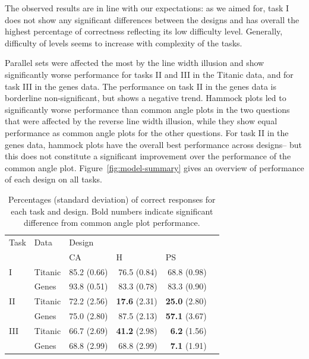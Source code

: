 \documentclass[journal]{vgtc}\usepackage{graphicx, color}
\begin{document}
The observed results are in line with our expectations:
as we aimed for, task I does not show any significant differences between the designs and has overall the highest percentage of correctness reflecting its low difficulty level. Generally, difficulty of levels seems to increase with complexity of the tasks.

Parallel sets were affected the most by the line width illusion and show significantly worse performance for tasks II and III in the Titanic data, and for task III in the genes data. The performance on task II in the genes data is borderline non-significant, but shows a negative trend.
Hammock plots led to significantly worse performance than common angle plots in the two questions that were affected by the reverse line width illusion, while they show equal performance as common angle plots for the other questions. For task II in the genes data,  hammock plots have the overall best performance  across designs-- but this  does not  constitute a significant improvement over the performance of the common angle plot. Figure~\ref{fig:model-summary} gives an overview of  performance of each design on all tasks. 



%
\begin{table}[ht]
\begin{center}
\begin{tabular}{llrrrr}
  \hline
Task & Data & \multicolumn{3}{l}{Design} \\
& & \multicolumn{1}{l}{CA} & \multicolumn{1}{l}{H}  & \multicolumn{1}{l}{PS}  \\ 
  \hline
 I & Titanic & 85.2 (0.66) & 76.5 (0.84) & 68.8 (0.98) \\ 
& Genes & 93.8 (0.51) & 83.3 (0.78) & 83.3 (0.90) \\ [3pt]
 II& Titanic & 72.2 (2.56) & {\bf 17.6} (2.31) & {\bf 25.0} (2.80) \\ 
& Genes & 75.0 (2.80) & 87.5 (2.13) & {\bf 57.1} (3.67) \\ [3pt]
III & Titanic & 66.7 (2.69) & {\bf 41.2} (2.98) & {\bf 6.2} (1.56) \\ 
& Genes & 68.8 (2.99) & 68.8 (2.99) & {\bf 7.1} (1.91) \\ \hline
\end{tabular}
\end{center}
\caption{\label{raw} Percentages (standard deviation) of correct responses for each task and design. Bold numbers indicate significant difference from common angle plot performance.  }
\end{table}
\end{document}

